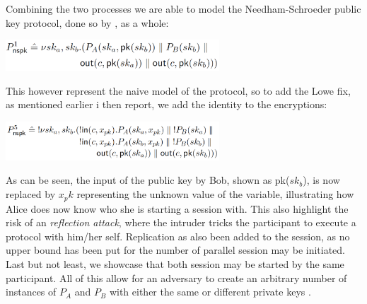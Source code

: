 \noindent Combining the two processes we are able to model the Needham-Schroeder public key protocol, done so by \citeauthor{DBLP:journals/ftpl/CortierK14}, as a whole: 
\begin{center}
\includegraphics[width=0.6\textwidth, angle=0]{Graphics/P1_nspk.pdf}
\end{center}
This however represent the naive model of the protocol, so to add the Lowe fix, as mentioned earlier i then report, we add the identity to the encryptions:
\begin{center}
\includegraphics[width=0.6\textwidth, angle=0]{Graphics/P5_nspk.pdf}
\end{center}
As can be seen, the input of the public key by Bob, shown as pk($sk_b$), is now replaced by $x_pk$ representing the unknown value of the variable, illustrating how Alice does now know who she is starting a session with. This also highlight the risk of an \textit{reflection attack}, where the intruder tricks the participant to execute a protocol with him/her self. Replication as also been added to the session, as no upper bound has been put for the number of parallel session may be initiated. Last but not least, we showcase that both session may be started by the same participant. All of this allow for an adversary to create an arbitrary number of instances of $P_A$ and $P_B$ with either the same or different private keys \autocite{DBLP:journals/ftpl/CortierK14}.

